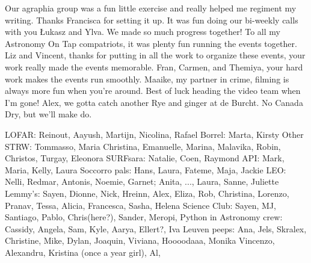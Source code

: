 \begin{thesisacknowledgements}
   Our agraphia group was a fun little exercise and really helped me regiment my writing. Thanks Francisca for setting it up. It was fun doing our bi-weekly calls with you \L{}ukasz and Ylva. We made so much progress together! To all my Astronomy On Tap compatriots, it was plenty fun running the events together. Liz and Vincent, thanks for putting in all the work to organize these events, your work really made the events memorable. Fran, Carmen,  and Themiya, your hard work makes the events run smoothly. Maaike, my partner in crime, filming is always more fun when you're around. Best of luck heading the video team when I'm gone! Alex, we gotta catch another Rye and ginger at de Burcht. No Canada Dry, but we'll make do.
















    LOFAR: Reinout, Aayush, Martijn, Nicolina, Rafael
    Borrel: Marta, Kirsty
    Other STRW: Tommasso, Maria Christina, Emanuelle, Marina, Malavika, Robin, Christos, Turgay, Eleonora
    SURFsara: Natalie, Coen, Raymond
    API: Mark, Maria, Kelly, Laura
    Soccorro pals: Hans, Laura, Fateme, Maja, Jackie
    LEO: Nelli, Redmar, Antonis, Noemie, Garnet; Anita, ..., Laura, Sanne, Juliette
    Lemmy's: Sayen, Dionne, Nick, Hreinn, Alex, Eliza, Rob, Christina, Lorenzo, Pranav, Tessa, Alicia, Francesca, Sasha, Helena
    Science Club: Sayen, MJ, Santiago, Pablo, Chris(here?), Sander, Meropi, 
    Python in Astronomy crew: Cassidy, Angela, Sam, Kyle, Aarya, Ellert?, Iva
    Leuven peeps: Ana, Jels, Skralex, Christine, Mike, Dylan, Joaquin, Viviana, Hoooodaaa, Monika
    Vincenzo, Alexandru, Kristina (once a year girl), Al, 


\end{thesisacknowledgements}
